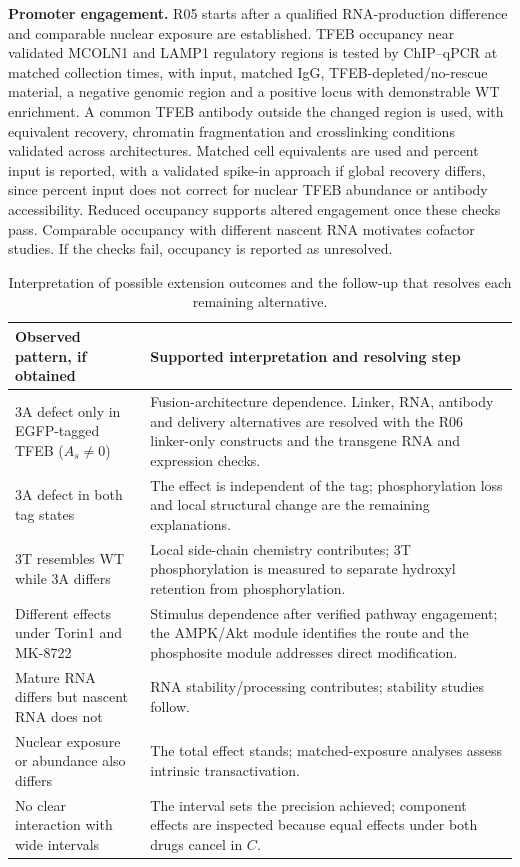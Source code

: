 \textbf{Promoter engagement.} R05 starts after a qualified RNA-production difference and comparable nuclear exposure are established. TFEB occupancy near validated MCOLN1 and LAMP1 regulatory regions is tested by ChIP--qPCR at matched collection times, with input, matched IgG, TFEB-depleted/no-rescue material, a negative genomic region and a positive locus with demonstrable WT enrichment. A common TFEB antibody outside the changed region is used, with equivalent recovery, chromatin fragmentation and crosslinking conditions validated across architectures. Matched cell equivalents are used and percent input is reported, with a validated spike-in approach if global recovery differs, since percent input does not correct for nuclear TFEB abundance or antibody accessibility. Reduced occupancy supports altered engagement once these checks pass. Comparable occupancy with different nascent RNA motivates cofactor studies. If the checks fail, occupancy is reported as unresolved.

\begin{table}[htbp]\centering\small
\caption{Interpretation of possible extension outcomes and the follow-up that resolves each remaining alternative.}\label{tab:research-decisions}
\begin{tabularx}{\textwidth}{L{0.36\textwidth}Y}
\toprule Observed pattern, if obtained & Supported interpretation and resolving step \\
\midrule
3A defect only in EGFP-tagged TFEB ($A_s\neq0$) & Fusion-architecture dependence. Linker, RNA, antibody and delivery alternatives are resolved with the R06 linker-only constructs and the transgene RNA and expression checks. \\
3A defect in both tag states & The effect is independent of the tag; phosphorylation loss and local structural change are the remaining explanations. \\
3T resembles WT while 3A differs & Local side-chain chemistry contributes; 3T phosphorylation is measured to separate hydroxyl retention from phosphorylation. \\
Different effects under Torin1 and MK-8722 & Stimulus dependence after verified pathway engagement; the AMPK/Akt module identifies the route and the phosphosite module addresses direct modification. \\
Mature RNA differs but nascent RNA does not & RNA stability/processing contributes; stability studies follow. \\
Nuclear exposure or abundance also differs & The total effect stands; matched-exposure analyses assess intrinsic transactivation. \\
No clear interaction with wide intervals & The interval sets the precision achieved; component effects are inspected because equal effects under both drugs cancel in $C$. \\
\bottomrule
\end{tabularx}
\end{table}

